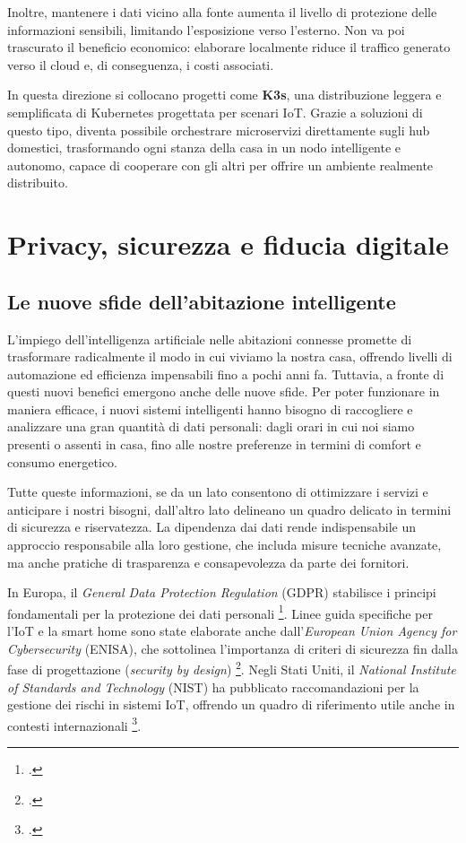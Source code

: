 Inoltre, mantenere i dati vicino alla fonte aumenta il livello di protezione delle informazioni sensibili, limitando l’esposizione verso l’esterno. Non va poi trascurato il beneficio economico: elaborare localmente riduce il traffico generato verso il cloud e, di conseguenza, i costi associati.  

In questa direzione si collocano progetti come \textbf{K3s}, una distribuzione leggera e semplificata di Kubernetes progettata per scenari IoT. Grazie a soluzioni di questo tipo, diventa possibile orchestrare microservizi direttamente sugli hub domestici, trasformando ogni stanza della casa in un nodo intelligente e autonomo, capace di cooperare con gli altri per offrire un ambiente realmente distribuito.


\section{Privacy, sicurezza e fiducia digitale}

\subsection{Le nuove sfide dell’abitazione intelligente}

L’impiego dell’intelligenza artificiale nelle abitazioni connesse promette di trasformare radicalmente il modo in cui viviamo la nostra casa, offrendo livelli di automazione ed efficienza impensabili fino a pochi anni fa. Tuttavia, a fronte di questi nuovi benefici emergono anche delle nuove sfide. Per poter funzionare in maniera efficace, i nuovi sistemi intelligenti hanno bisogno di raccogliere e analizzare una gran quantità di dati personali: dagli orari in cui noi siamo presenti o assenti in casa, fino alle nostre preferenze in termini di comfort e consumo energetico.  

Tutte queste informazioni, se da un lato consentono di ottimizzare i servizi e anticipare i nostri bisogni, dall’altro lato delineano un quadro delicato in termini di sicurezza e riservatezza. La dipendenza dai dati rende indispensabile un approccio responsabile alla loro gestione, che includa misure tecniche avanzate, ma anche pratiche di trasparenza e consapevolezza da parte dei fornitori.  

In Europa, il \textit{General Data Protection Regulation} (GDPR) stabilisce i principi fondamentali per la protezione dei dati personali \footcite{gdpr}. Linee guida specifiche per l’IoT e la smart home sono state elaborate anche dall’\textit{European Union Agency for Cybersecurity} (ENISA), che sottolinea l’importanza di criteri di sicurezza fin dalla fase di progettazione (\textit{security by design}) \footcite{enisa-smart-home}. Negli Stati Uniti, il \textit{National Institute of Standards and Technology} (NIST) ha pubblicato raccomandazioni per la gestione dei rischi in sistemi IoT, offrendo un quadro di riferimento utile anche in contesti internazionali \footcite{nist-iot}.  

